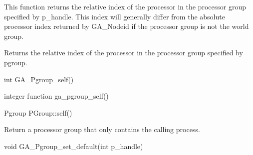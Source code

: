 \documentclass[12pt]{article}
\begin{document}
\local

\begin{desc}
This function returns the relative index of the processor in the processor
group specified by p_handle. This index will generally differ from the absolute
processor index returned by GA_Nodeid if the processor group is not the world
group.

Returns the relative index of the processor in the processor group
specified by pgroup.
\end{desc}



\begin{capi}
\begin{ccode}
int GA_Pgroup_self()
\end{ccode}
\begin{funcargs}
\end{funcargs}
\end{capi}

\begin{fapi}
\begin{fcode}
integer function ga_pgroup_self()
\end{fcode}
\begin{funcargs}
\end{funcargs}
\end{fapi}

\begin{cxxapi}
\begin{cxxcode}
Pgroup PGroup::self()
\end{cxxcode}
\end{cxxapi}

\begin{desc}

Return a processor group that only contains the calling process.

\end{desc}

\ncoll



\begin{capi}
\begin{ccode}
void GA_Pgroup_set_default(int p_handle)
\end{ccode}
\begin{funcargs}
\end{funcargs}
\end{capi}
\end{document}
